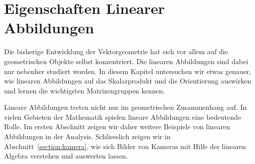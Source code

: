 %
%
%
\chapter{Eigenschaften Linearer Abbildungen\label{chapter:eigenschaften}}
\rhead{}
Die bisherige Entwicklung der Vektorgeometrie hat sich vor allem auf
die geometrischen Objekte selbst konzentriert. 
Die linearen Abbildungen sind dabei nur nebenher studiert worden.
In diesem Kapitel untersuchen wir etwas genauer, wie linearen Abbildungen
auf das Skalarprodukt und die Orientierung auswirken und lernen die
wichtigsten Matrizengruppen kennen.

Lineare Abbildungen treten nicht nur im geometrischen Zusammenhang auf.
In vielen Gebieten der Mathematik spielen lineare Abbildungen eine
bedeutende Rolle.
Im ersten Abschnitt zeigen wir daher weitere Beispiele von linearen
Abbildungen in der Analysis.
Schliesslich zeigen wir in Abschnitt~\ref{section:kamera}, wie sich
Bilder von Kameras mit Hilfe der linearen Algebra verstehen und auswerten
lassen.





%





